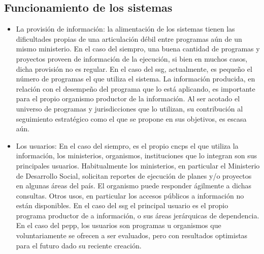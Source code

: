 \subsection{Funcionamiento de los sistemas}
    \begin{itemize}
        \item La provisión de información: la alimentación de los sistemas tienen las dificultades propias de una articulación débil entre programas aún de un mismo ministerio. En el caso del \ac{siempro}, una buena cantidad de programas y proyectos proveen de información de la ejecución, si bien en muchos casos, dicha provisión no es regular. En el caso del \ac{ssg}, actualmente, es pequeño el número de programas el que utiliza el sistema. La información producida, en relación con el desempeño del programa que lo está aplicando, es importante para el propio organismo productor de la información. Al ser acotado el universo de programas y jurisdicciones que lo utilizan, su contribución al seguimiento estratégico como el que se propone en sus objetivos, es escasa aún. 
        \item Los usuarios: En el caso del \ac{siempro}, es el propio \ac{cncps} el que utiliza la información, los ministerios, organismos, instituciones que lo integran son sus principales usuarios.  Habitualmente los ministerios, en particular el Ministerio de Desarrollo Social, solicitan reportes de ejecución de planes y/o proyectos en algunas áreas del país. El organismo puede responder ágilmente a dichas consultas. Otros usos, en particular los accesos públicos a información no están disponibles. En el caso del \ac{ssg}  el principal usuario es el propio programa productor de a información, o sus áreas jerárquicas de dependencia. En el caso del \ac{pepp}, los usuarios son programas u organismos que voluntariamente se ofrecen a ser evaluados, pero con resultados optimistas para el futuro dado su reciente creación.
    \end{itemize}


